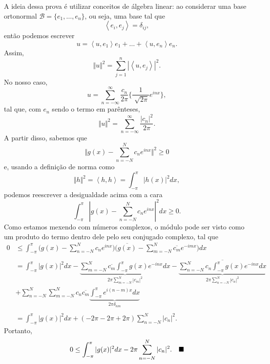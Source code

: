 \documentclass[../pde_notes.tex]{subfiles}
\begin{document}
\begin{proof*}[Ideia]
	A ideia dessa prova é utilizar conceitos de álgebra linear: ao considerar uma base ortonormal \(\mathcal{B}=\{e_{1},\dotsc ,e_{n}\}\), ou seja, uma base tal que
	\[
		\left< e_{i}, e_{j} \right>=\delta_{ij},
	\]
	então podemos escrever
	\[
		u=\left< u, e_{1} \right>e_{1}+\dotsc + \left< u, e_{n} \right>e_{n}.
	\]
	Assim,
	\[
		\Vert u \Vert^{2}=\sum\limits_{j=1}^{n}|\left< u, e_{j} \right>|^{2}.
	\]
	No nosso caso,
	\[
		u=\sum\limits_{n=-\infty}^{\infty}\frac{c_{n}}{2\pi }\biggl\{\frac{1}{\sqrt[]{2\pi }}e^{inx}\biggr\},
	\]
	tal que, com \(e_{n}\) sendo o termo em parênteses,
	\[
		\Vert u \Vert^{2}=\sum\limits_{n=-\infty}^{\infty}\frac{|c_{n}|^{2}}{2\pi }.
	\]
	A partir disso, sabemos que
	\[
		\biggl\Vert g(x)-\sum\limits_{n=-N}^{N}c_{n}e^{inx} \biggr\Vert^{2}\geq 0
	\]
	e, usando a definição de norma como
	\[
		\Vert h \Vert^{2}=\left< h, h \right>=\int_{-\pi }^{\pi }|h(x)|^{2}dx,
	\]
	podemos reescrever a desigualdade acima com a cara
	\[
		\int_{-\pi }^{\pi }|g(x)-\sum\limits_{n=-N}^{N}c_{n}e^{inx}|^{2}dx\geq 0.
	\]
	Como estamos mexendo com números complexos, o módulo pode ser visto como um produto do termo dentro dele pelo seu conjugado complexo, tal que
	\begin{align*}
		0 & \leq \int_{-\pi }^{\pi }\biggl(g(x)-\sum\limits_{n=-N}^{N}c_{n}e^{inx}\biggr)\biggl(\overline{g(x)}-\sum\limits_{m=-N}^{N}\overline{c_{m}}e^{-imx}\biggr)dx                                                                                                                                      \\
		\\
		  & =\int_{-\pi }^{\pi }|g(x)|^{2}dx - \underbrace{\sum\limits_{m=-N}^{N}\overline{c_{m}}\int_{-\pi }^{\pi }g(x)e^{-inx}dx}_{2\pi \sum\limits_{m=-N}^{N}|c_{m}|^{2}} - \underbrace{\overline{\sum\limits_{n=-N}^{N}c_{n}\int_{-\pi }^{\pi }g(x)e^{-inx}dx}}_{2\pi \sum\limits_{n=-N}^{N}|c_{n}|^{2}} \\
		  & +\sum\limits_{n=-N}^{N}\sum\limits_{m=-N}^{N}c_{n}\overline{c_{m}}\underbrace{\int_{-\pi }^{\pi }e^{i(n-m)x}dx}_{2\pi \delta_{nm}}                                                                                                                                                               \\
		\\
		  & = \int_{-\pi }^{\pi }|g(x)|^{2}dx + (-2\pi - 2\pi + 2\pi)\sum\limits_{n=-N}^{N}|c_{n}|^{2}.
	\end{align*}
	Portanto,
	\[
		0\leq \int_{-\pi }^{\pi }|g(x)|^{2}dx - 2\pi \sum\limits_{n=-N}^{N}|c_{n}|^{2}.\quad \text{$\blacksquare$}
	\]
\end{proof*}
\end{document}
